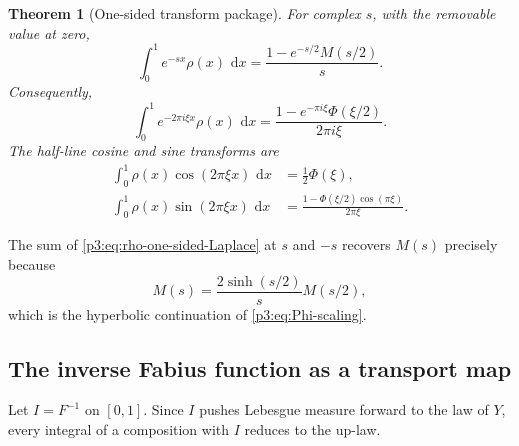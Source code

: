 \documentclass[11pt]{article}
\newtheorem{theorem}{Theorem}[section]
\theoremstyle{definition}
\theoremstyle{remark}
\newcommand{\dd}{\,\mathrm d}
\begin{document}
\begin{theorem}[One-sided transform package]\label{p3:thm:one-sided}
For complex \(s\), with the removable value at zero,
\begin{equation}
 \boxed{
 \int_0^1e^{-sx}\rho(x)\,\dd x
 =\frac{1-e^{-s/2}M(s/2)}{s}.
 }                                                           \label{p3:eq:rho-one-sided-Laplace}
\end{equation}
Consequently,
\begin{equation}
 \boxed{
 \int_0^1e^{-2\pi i\xi x}\rho(x)\,\dd x
 =\frac{1-e^{-\pi i\xi}\Phi(\xi/2)}{2\pi i\xi}.
 }                                                           \label{p3:eq:rho-one-sided-Fourier}
\end{equation}
The half-line cosine and sine transforms are
\begin{align}
 \int_0^1\rho(x)\cos(2\pi\xi x)\,\dd x
 &=\frac12\Phi(\xi),                                        \label{p3:eq:rho-half-cos}\\
 \int_0^1\rho(x)\sin(2\pi\xi x)\,\dd x
 &=\frac{1-\Phi(\xi/2)\cos(\pi\xi)}{2\pi\xi}.             \label{p3:eq:rho-half-sin}
\end{align}
\end{theorem}

The sum of \eqref{p3:eq:rho-one-sided-Laplace} at \(s\) and \(-s\) recovers
\(M(s)\) precisely because
\begin{equation}
 M(s)=\frac{2\sinh(s/2)}{s}M(s/2),                           \label{p3:eq:M-scaling}
\end{equation}
which is the hyperbolic continuation of \eqref{p3:eq:Phi-scaling}.

\subsection{The inverse Fabius function as a transport map}

Let \(I=F^{-1}\) on \([0,1]\).  Since \(I\) pushes Lebesgue measure forward to the law
of \(Y\), every integral of a composition with \(I\) reduces to the up-law.
\end{document}
